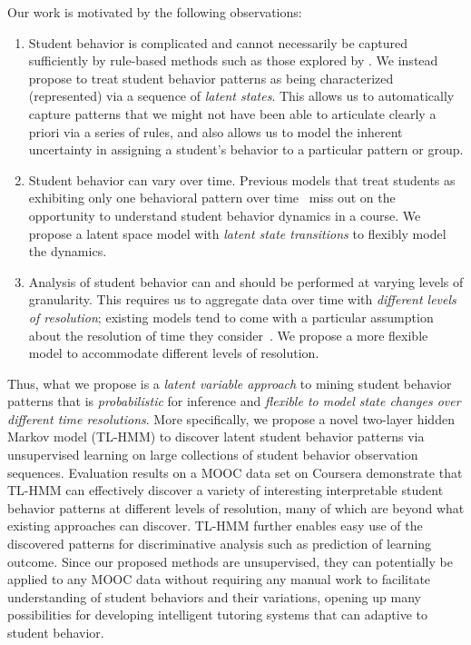 Our work is motivated by the following observations:
\begin{enumerate}
  \item Student behavior is complicated and cannot necessarily be captured
      sufficiently by rule-based methods such as those explored by
      \citet{Kizilcec:2013:LAK}. We instead propose to treat
      student behavior patterns as being characterized (represented) via a sequence of
      \emph{latent states}. This allows us to automatically capture
      patterns that we might not have been able to articulate clearly a
      priori via a series of rules, and also allows us to model the
      inherent uncertainty in assigning a student's behavior to a
      particular pattern or group. 
  \item Student behavior can vary over time. Previous models that treat students
      as exhibiting only one behavioral pattern over
      time~\cite{Faucon:2016:EDM} miss out on the opportunity to understand
      student behavior dynamics in a course. We propose a latent space model with {\em latent state transitions} to flexibly model the dynamics. 
  \item Analysis of student behavior can and should be performed at varying
      levels of granularity. This requires us to aggregate data over time
      with \emph{different levels of resolution}; existing models tend to come
      with a particular assumption about the resolution of time they
      consider~\cite{Faucon:2016:EDM, Kizilcec:2013:LAK, Shih:2010:EDM}. We propose a more flexible model to accommodate different levels of resolution. 
\end{enumerate}

Thus, what we propose is a \emph{latent variable approach} to mining student behavior
patterns that is \emph{probabilistic} for inference and 
\emph{flexible to model state changes over different time resolutions}. 
More specifically, we propose a novel two-layer hidden Markov model (TL-HMM) to
 discover latent student behavior patterns via
unsupervised learning on large collections of student behavior observation
sequences. Evaluation results on a MOOC data set on Coursera demonstrate that TL-HMM can effectively 
discover a variety of interesting interpretable student behavior patterns at different levels of resolution, many of which are beyond what existing approaches can discover. TL-HMM further enables easy use of the discovered patterns for discriminative analysis such as prediction of learning outcome. 
Since our proposed methods are unsupervised, they can potentially be applied to any MOOC data without requiring any manual work to facilitate understanding of student behaviors and their variations, opening up many possibilities for developing intelligent tutoring systems that can adaptive to student behavior. 


